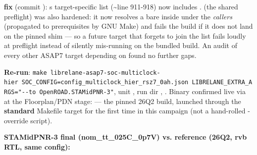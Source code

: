 \begin{record}

\textbf{ fix} (commit ):
\textquotesingle s target-specific
 list (\textasciitilde line 911-918) now includes
. 
(the shared preflight) was also hardened: it now resolves a bare
 inside  under the
\emph{caller\textquotesingle s}  (propagated to
prerequisites by GNU Make) and fails the build if it does not land on
the pinned shim --- so a future target that forgets to join the list
fails loudly at preflight instead of silently mis-running on the bundled
build. An audit of every other ASAP7 target depending on
 found no further gaps.

\textbf{Re-run}:
\texttt{make\ librelane-\allowbreak{}asap7-\allowbreak{}soc-\allowbreak{}multiclock-\allowbreak{}hier\ SOC\_\allowbreak{}CONFIG=\allowbreak{}config\_\allowbreak{}multiclock\_\allowbreak{}hier\_\allowbreak{}rsz7\_\allowbreak{}0ah.\allowbreak{}json\ LIBRELANE\_\allowbreak{}EXTRA\_\allowbreak{}ARGS=\allowbreak{}"-\allowbreak{}-\allowbreak{}to\ OpenROAD.\allowbreak{}STAMidPNR-\allowbreak{}3"},
unit , run dir
, .
Binary confirmed live via  at the
Floorplan/\allowbreak{}PDN stage:
--- the pinned 26Q2 build, launched through the \textbf{standard}
Makefile target for the first time in this campaign (not a hand-rolled
-override script).

\textbf{STAMidPNR-3 final
(nom\_\allowbreak{}tt\_\allowbreak{}025C\_\allowbreak{}0p7V) vs.
reference  (26Q2, rvb RTL, same config):}


\end{record}
